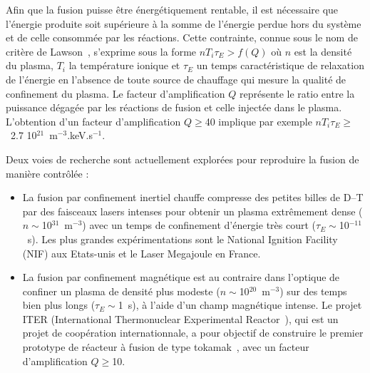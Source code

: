 Afin que la fusion puisse être énergétiquement rentable, il est nécessaire
que l’énergie produite soit supérieure à la somme de l’énergie perdue hors du
système et de celle consommée par les réactions. Cette contrainte, connue sous
le nom de critère de Lawson~\parencite{Lawson}, s'exprime sous la forme
$nT_i\tau_E>f(Q)$ où $n$ est la densité du plasma, $T_i$ la température ionique
et $\tau_E$ un temps caractéristique de relaxation de l'énergie en l'absence de
toute source de chauffage qui mesure la qualité de confinement du plasma. Le
facteur d'amplification $Q$ représente le ratio entre la puissance dégagée par
les réactions de fusion et celle injectée dans le plasma. L'obtention d'un
facteur d'amplification $Q\geq$40 implique par exemple $nT_i\tau_E\geq$~2.7
10$^{21}$~m$^{-3}$.keV.s$^{-1}$.

Deux voies de recherche sont actuellement explorées
pour reproduire la fusion de manière contrôlée :

\begin{itemize}
	\item La fusion par confinement inertiel chauffe compresse des petites
	billes de D--T par des faisceaux lasers intenses pour obtenir un plasma
	extrêmement dense ($n\sim$10$^{31}$~m$^{-3}$) avec un temps de confinement
	d'énergie très court ($\tau_E\sim$10$^{-11}$~s). Les plus grandes
	expérimentations sont le National Ignition Facility (NIF) aux Etats-unis et le
	Laser Megajoule en France.
	\item La fusion par confinement magnétique est au contraire dans l'optique de
	confiner un plasma de densité plus modeste ($n\sim$10$^{20}$~m$^{-3}$) sur des
	temps bien plus longs ($\tau_E\sim$1~s), à l'aide d'un champ magnétique
	intense. Le projet ITER (International Thermonuclear
	Experimental Reactor~\parencite{ITER}), qui est un projet de coopération
	internationnale, a pour objectif de construire le premier prototype de
	réacteur à fusion de type tokamak~\parencite{Wesson}, avec un facteur d'amplification
	$Q\geq$10.
\end{itemize}

